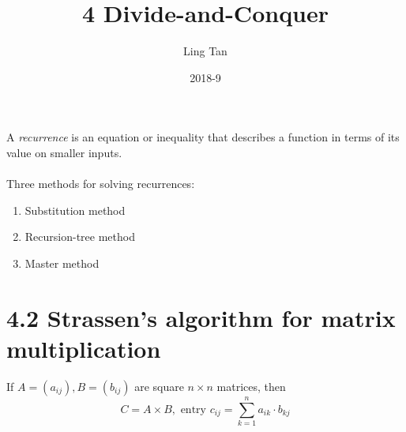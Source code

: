 \documentclass[a4paper]{article}
\title{4 Divide-and-Conquer}
\author{Ling Tan}
\date{2018-9}
\theoremstyle{plain}
\begin{document}
\maketitle
A  \textit{recurrence} is an equation or inequality that describes a function in terms of its value on smaller inputs.\\
\\
Three methods for solving recurrences:
\begin{enumerate}
    \item Substitution method
    \item Recursion-tree method
    \item Master method
\end{enumerate}
\section*{4.2 Strassen’s algorithm for matrix multiplication}
If $A=(a_{ij}), B=(b_{ij})$ are square $n\times n$ matrices, then
\begin{equation*}
    C=A\times B, \text{ entry }c_{ij}=\sum_{k=1}^n a_{ik}\cdot b_{kj}
\end{equation*}
\end{document}
